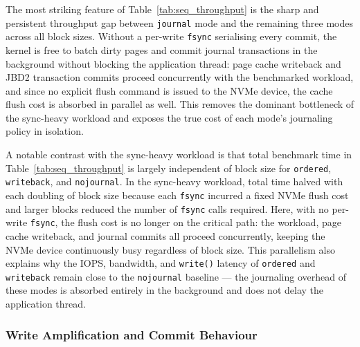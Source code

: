 \documentclass[12pt,a4paper]{article}
\begin{document}
The most striking feature of Table~\ref{tab:seq_throughput} is the sharp and persistent
throughput gap between \texttt{journal} mode and the remaining three modes across all
block sizes. Without a per-write \texttt{fsync} serialising every commit, the kernel
is free to batch dirty pages and commit journal transactions in the background without
blocking the application thread: page cache writeback and JBD2 transaction commits
proceed concurrently with the benchmarked workload, and since no explicit flush command
is issued to the NVMe device, the cache flush cost is absorbed in parallel as well.
This removes the dominant bottleneck of the sync-heavy workload and exposes the true
cost of each mode's journaling policy in isolation.

A notable contrast with the sync-heavy workload is that total benchmark time in
Table~\ref{tab:seq_throughput} is largely independent of block size for
\texttt{ordered}, \texttt{writeback}, and \texttt{nojournal}. In the sync-heavy
workload, total time halved with each doubling of block size because each
\texttt{fsync} incurred a fixed NVMe flush cost and larger blocks reduced the number of
\texttt{fsync} calls required. Here, with no per-write \texttt{fsync}, the flush cost
is no longer on the critical path: the workload, page cache writeback, and journal
commits all proceed concurrently, keeping the NVMe device continuously busy regardless
of block size. This parallelism also explains why the IOPS, bandwidth, and
\texttt{write()} latency of \texttt{ordered} and \texttt{writeback} remain close to the
\texttt{nojournal} baseline --- the journaling overhead of these modes is absorbed
entirely in the background and does not delay the application thread.

\subsubsection{Write Amplification and Commit Behaviour}
\end{document}
